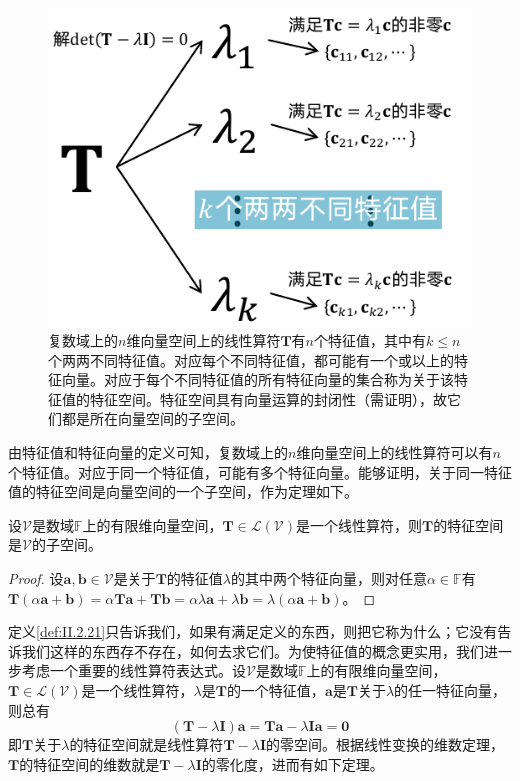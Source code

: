 \documentclass[../main.tex]{subfiles}
\begin{document}
\begin{figure}[ht]
    \centering
    \includegraphics{images/characteristic_values.pdf}
    \caption{复数域上的$n$维向量空间上的线性算符$\mathbf{T}$有$n$个特征值，其中有$k\leq n$个两两不同特征值。对应每个不同特征值，都可能有一个或以上的特征向量。对应于每个不同特征值的所有特征向量的集合称为关于该特征值的特征空间。特征空间具有向量运算的封闭性（需证明），故它们都是所在向量空间的子空间。}
    \label{fig:II.2.3}
\end{figure}

由特征值和特征向量的定义可知，复数域上的$n$维向量空间上的线性算符可以有$n$个特征值。对应于同一个特征值，可能有多个特征向量。能够证明，关于同一特征值的特征空间是向量空间的一个子空间，作为定理如下。

\begin{theorem}\label{thm:II.2.26}
    设$\mathcal{V}$是数域$\mathbb{F}$上的有限维向量空间，$\mathbf{T}\in\mathcal{L}\left(\mathcal{V}\right)$是一个线性算符，则$\mathbf{T}$的特征空间是$\mathcal{V}$的子空间。
\end{theorem}
\begin{proof}
    设$\mathbf{a},\mathbf{b}\in\mathcal{V}$是关于$\mathbf{T}$的特征值$\lambda$的其中两个特征向量，则对任意$\alpha\in\mathbb{F}$有$\mathbf{T}\left(\alpha\mathbf{a}+\mathbf{b}\right)=\alpha\mathbf{Ta}+\mathbf{Tb}=\alpha\lambda\mathbf{a}+\lambda\mathbf{b}=\lambda\left(\alpha\mathbf{a}+\mathbf{b}\right)$。
\end{proof}

定义\ref{def:II.2.21}只告诉我们，如果有满足定义的东西，则把它称为什么；它没有告诉我们这样的东西存不存在，如何去求它们。为使特征值的概念更实用，我们进一步考虑一个重要的线性算符表达式。设$\mathcal{V}$是数域$\mathbb{F}$上的有限维向量空间，$\mathbf{T}\in\mathcal{L}\left(\mathcal{V}\right)$是一个线性算符，$\lambda$是$\mathbf{T}$的一个特征值，$\mathbf{a}$是$\mathbf{T}$关于$\lambda$的任一特征向量，则总有
\[\left(\mathbf{T}-\lambda\mathbf{I}\right)\mathbf{a}=\mathbf{Ta}-\lambda\mathbf{Ia}=\mathbf{0}\]
即$\mathbf{T}$关于$\lambda$的特征空间就是线性算符$\mathbf{T}-\lambda\mathbf{I}$的零空间。根据线性变换的维数定理，$\mathbf{T}$的特征空间的维数就是$\mathbf{T}-\lambda\mathbf{I}$的零化度，进而有如下定理。
\end{document}
